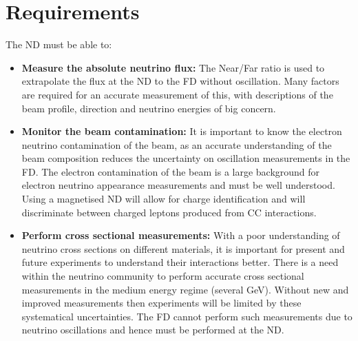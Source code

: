 \section{Requirements}
The ND must be able to:
\begin{itemize}
	\item{\textbf{Measure the absolute neutrino flux:}} The Near/Far ratio is used to extrapolate the flux at the ND to the FD without oscillation. Many factors are required for an accurate measurement of this, with descriptions of the beam profile, direction and neutrino energies of big concern.
	\item{\textbf{Monitor the beam contamination:}} It is important to know the electron neutrino contamination of the beam, as an accurate understanding of the beam composition reduces the uncertainty on oscillation measurements in the FD. The electron contamination of the beam is a large background for electron neutrino appearance measurements and must be well understood. Using a magnetised ND will allow for charge identification and will discriminate between charged leptons produced from CC interactions.
	\item{\textbf{Perform cross sectional measurements:}} With a poor understanding of neutrino cross sections on different materials, it is important for present and future experiments to understand their interactions better. There is a need within the neutrino community to perform accurate cross sectional measurements in the medium energy regime (several GeV). Without new and improved measurements then experiments will be limited by these systematical uncertainties. The FD cannot perform such measurements due to neutrino oscillations and hence must be performed at the ND.
\end{itemize}

